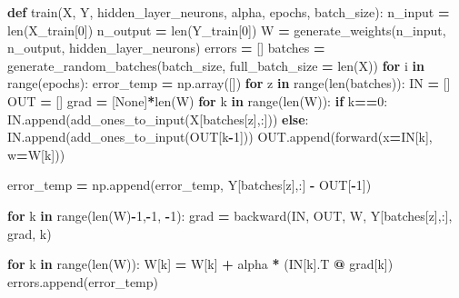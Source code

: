 \documentclass[
]{book}
\newenvironment{Shaded}{\begin{snugshade}}{\end{snugshade}}
\newcommand{\BuiltInTok}[1]{#1}
\newcommand{\ControlFlowTok}[1]{\textcolor[rgb]{0.13,0.29,0.53}{\textbf{#1}}}
\newcommand{\DecValTok}[1]{\textcolor[rgb]{0.00,0.00,0.81}{#1}}
\newcommand{\KeywordTok}[1]{\textcolor[rgb]{0.13,0.29,0.53}{\textbf{#1}}}
\newcommand{\NormalTok}[1]{#1}
\newcommand{\OperatorTok}[1]{\textcolor[rgb]{0.81,0.36,0.00}{\textbf{#1}}}
\newcommand{\VariableTok}[1]{\textcolor[rgb]{0.00,0.00,0.00}{#1}}
\begin{document}
\begin{Shaded}
\begin{Highlighting}[]
\KeywordTok{def}\NormalTok{ train(X, Y, hidden\_layer\_neurons, alpha, epochs, batch\_size):}
\NormalTok{  n\_input }\OperatorTok{=} \BuiltInTok{len}\NormalTok{(X\_train[}\DecValTok{0}\NormalTok{])}
\NormalTok{  n\_output }\OperatorTok{=} \BuiltInTok{len}\NormalTok{(Y\_train[}\DecValTok{0}\NormalTok{])}
\NormalTok{  W }\OperatorTok{=}\NormalTok{ generate\_weights(n\_input, n\_output, hidden\_layer\_neurons)}
\NormalTok{  errors }\OperatorTok{=}\NormalTok{ []}
\NormalTok{  batches }\OperatorTok{=}\NormalTok{ generate\_random\_batches(batch\_size, full\_batch\_size }\OperatorTok{=} \BuiltInTok{len}\NormalTok{(X))}
  \ControlFlowTok{for}\NormalTok{ i }\KeywordTok{in} \BuiltInTok{range}\NormalTok{(epochs):}
\NormalTok{    error\_temp }\OperatorTok{=}\NormalTok{ np.array([])}
    \ControlFlowTok{for}\NormalTok{ z }\KeywordTok{in} \BuiltInTok{range}\NormalTok{(}\BuiltInTok{len}\NormalTok{(batches)):}
\NormalTok{      IN }\OperatorTok{=}\NormalTok{ []}
\NormalTok{      OUT }\OperatorTok{=}\NormalTok{ []}
\NormalTok{      grad }\OperatorTok{=}\NormalTok{ [}\VariableTok{None}\NormalTok{]}\OperatorTok{*}\BuiltInTok{len}\NormalTok{(W)}
      \ControlFlowTok{for}\NormalTok{ k }\KeywordTok{in} \BuiltInTok{range}\NormalTok{(}\BuiltInTok{len}\NormalTok{(W)):}
        \ControlFlowTok{if}\NormalTok{ k}\OperatorTok{==}\DecValTok{0}\NormalTok{:}
\NormalTok{          IN.append(add\_ones\_to\_input(X[batches[z],:]))}
        \ControlFlowTok{else}\NormalTok{:}
\NormalTok{          IN.append(add\_ones\_to\_input(OUT[k}\OperatorTok{{-}}\DecValTok{1}\NormalTok{]))}
\NormalTok{        OUT.append(forward(x}\OperatorTok{=}\NormalTok{IN[k], w}\OperatorTok{=}\NormalTok{W[k]))}
        
\NormalTok{      error\_temp }\OperatorTok{=}\NormalTok{ np.append(error\_temp, Y[batches[z],:] }\OperatorTok{{-}}\NormalTok{ OUT[}\OperatorTok{{-}}\DecValTok{1}\NormalTok{])}
        
      \ControlFlowTok{for}\NormalTok{ k }\KeywordTok{in} \BuiltInTok{range}\NormalTok{(}\BuiltInTok{len}\NormalTok{(W)}\OperatorTok{{-}}\DecValTok{1}\NormalTok{,}\OperatorTok{{-}}\DecValTok{1}\NormalTok{, }\OperatorTok{{-}}\DecValTok{1}\NormalTok{):}
\NormalTok{        grad }\OperatorTok{=}\NormalTok{ backward(IN, OUT, W, Y[batches[z],:], grad, k) }
        
      \ControlFlowTok{for}\NormalTok{ k }\KeywordTok{in} \BuiltInTok{range}\NormalTok{(}\BuiltInTok{len}\NormalTok{(W)):}
\NormalTok{        W[k] }\OperatorTok{=}\NormalTok{ W[k] }\OperatorTok{+}\NormalTok{ alpha }\OperatorTok{*}\NormalTok{ (IN[k].T }\OperatorTok{@}\NormalTok{ grad[k])}
\NormalTok{    errors.append(error\_temp)}
    

\end{Highlighting}
\end{Shaded}
\end{document}
